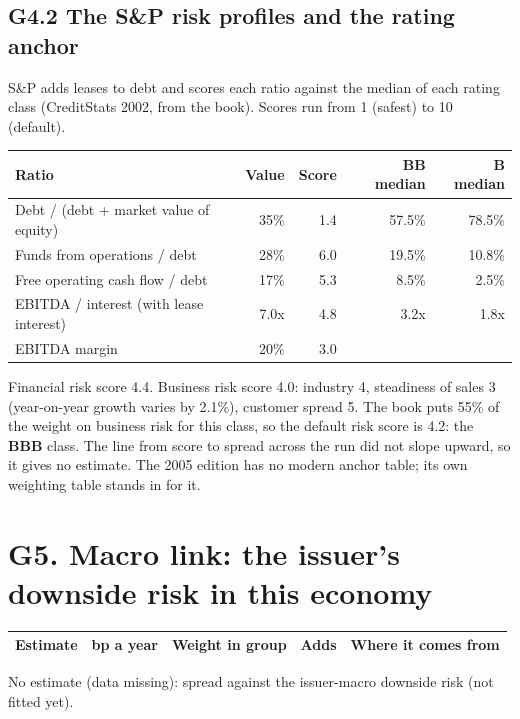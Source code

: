\documentclass[11pt,a4paper]{article}
\begin{document}
\subsection*{G4.2 The S\&P risk profiles and the rating anchor}
S\&P adds leases to debt and scores each ratio against the median of each rating class (CreditStats 2002, from the book). Scores run from 1 (safest) to 10 (default).
\begin{center}\footnotesize\setlength{\tabcolsep}{3.5pt}\begin{tabular}{@{}lrrrr@{}}\toprule
Ratio & Value & Score & BB median & B median \\\midrule
Debt / (debt + market value of equity) & 35\% & 1.4 & 57.5\% & 78.5\% \\
Funds from operations / debt & 28\% & 6.0 & 19.5\% & 10.8\% \\
Free operating cash flow / debt & 17\% & 5.3 & 8.5\% & 2.5\% \\
EBITDA / interest (with lease interest) & 7.0x & 4.8 & 3.2x & 1.8x \\
EBITDA margin & 20\% & 3.0 &  &  \\
\bottomrule\end{tabular}\end{center}
Financial risk score 4.4. Business risk score 4.0: industry 4, steadiness of sales 3 (year-on-year growth varies by 2.1\%), customer spread 5. The book puts 55\% of the weight on business risk for this class, so the default risk score is 4.2: the \textbf{BBB} class. The line from score to spread across the run did not slope upward, so it gives no estimate. The 2005 edition has no modern anchor table; its own weighting table stands in for it.
\section*{G5. Macro link: the issuer's downside risk in this economy}
\par\noindent{}
\begin{center}\footnotesize\setlength{\tabcolsep}{3.5pt}\begin{tabular}{@{}p{6.2cm}rrrp{4.2cm}@{}}\toprule
Estimate & bp a year & Weight in group & Adds & Where it comes from \\\midrule
\bottomrule\end{tabular}\end{center}
No estimate (data missing): spread against the issuer-macro downside risk (not fitted yet).
\end{document}
